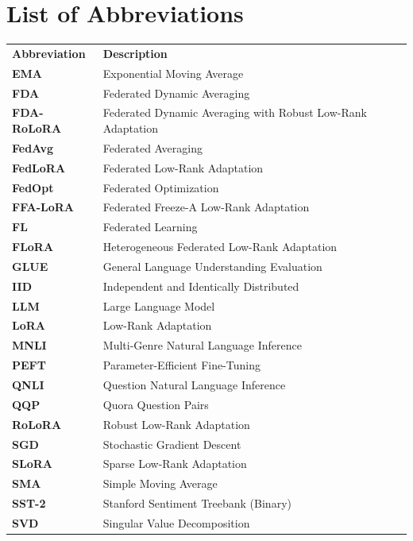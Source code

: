 \chapter*{List of Abbreviations}

{\color{tucdarkred}
\begin{tabular}{@{}ll@{}}
\textbf{Abbreviation} & \textbf{Description} \\[6pt]
\textbf{EMA}          & Exponential Moving Average \\
\textbf{FDA}          & Federated Dynamic Averaging \\
\textbf{FDA-RoLoRA}   & Federated Dynamic Averaging with Robust Low-Rank Adaptation \\
\textbf{FedAvg}       & Federated Averaging \\
\textbf{FedLoRA}      & Federated Low-Rank Adaptation \\
\textbf{FedOpt}       & Federated Optimization \\
\textbf{FFA-LoRA}     & Federated Freeze-A Low-Rank Adaptation \\
\textbf{FL}           & Federated Learning \\
\textbf{FLoRA}        & Heterogeneous Federated Low-Rank Adaptation \\
\textbf{GLUE}         & General Language Understanding Evaluation \\
\textbf{IID}          & Independent and Identically Distributed \\
\textbf{LLM}          & Large Language Model \\
\textbf{LoRA}         & Low-Rank Adaptation \\
\textbf{MNLI}         & Multi-Genre Natural Language Inference \\
\textbf{PEFT}         & Parameter-Efficient Fine-Tuning \\
\textbf{QNLI}         & Question Natural Language Inference \\
\textbf{QQP}          & Quora Question Pairs \\
\textbf{RoLoRA}       & Robust Low-Rank Adaptation \\
\textbf{SGD}          & Stochastic Gradient Descent \\
\textbf{SLoRA}        & Sparse Low-Rank Adaptation \\
\textbf{SMA}          & Simple Moving Average \\
\textbf{SST-2}        & Stanford Sentiment Treebank (Binary) \\
\textbf{SVD}          & Singular Value Decomposition \\
\end{tabular}
}
